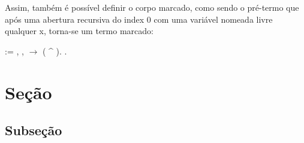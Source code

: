 Assim, também é possível definir o corpo marcado, como sendo o pré-termo que após uma abertura
recursiva do index 0 com uma variável nomeada livre qualquer x, torna-se um termo marcado:\begin{coqdoccode}
\coqdocemptyline
\coqdocnoindent
{}   :=\coqdoceol
\coqdocindent{1.00em}
\coqdoctac{\ensuremath{\exists}} , \coqdockw{\ensuremath{\forall}} ,    \ensuremath{\rightarrow}  ( \^{} ).\coqdoceol
\coqdocemptyline
\coqdocnoindent
{}  .\coqdoceol
\coqdocemptyline
\coqdocemptyline
\coqdocemptyline
\end{coqdoccode}
\section{Seção}



\subsection{Subseção}



